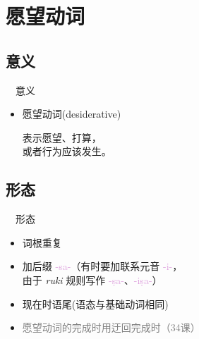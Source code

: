 \documentclass[17pt]{beamer}
\newcommand{\pratyaya}[1]{\mbox{\textcolor{Plum}{#1}}}
\newcommand{\notsoimportant}[1]{\textcolor{gray}{#1}}
\begin{document}
\section{愿望动词}
\begin{frame}{\insertsection}
  \small
  \tableofcontents[currentsection]
\end{frame}

\subsection{意义}
\begin{frame}{\insertsection ~~意义}
  \begin{itemize}
    \item 愿望动词(desiderative)
    \vspace{1em}

    表示愿望、打算，\\或者行为应该发生。
  \end{itemize}
\end{frame}

\subsection{形态}
\begin{frame}{\insertsection ~~形态}
  \small
  \begin{itemize}
    \item 词根重复
    \item 加后缀 \pratyaya{-sa-}（有时要加联系元音 \pratyaya{-i-}，\\
      由于 \emph{ruki} 规则写作 \pratyaya{-ṣa-}、\pratyaya{-iṣa-}）
    \item 现在时语尾(语态与基础动词相同)
    \item \notsoimportant{愿望动词的完成时用迂回完成时（34课）}
  \end{itemize}
\end{frame}
\end{document}
